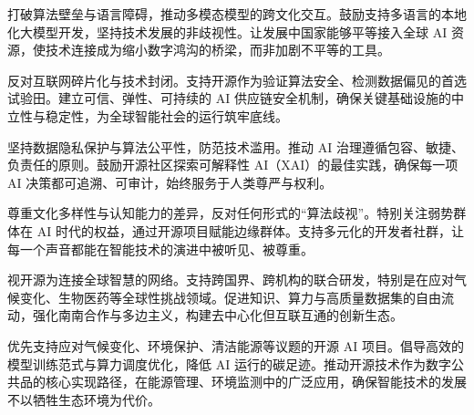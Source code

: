 打破算法壁垒与语言障碍，推动多模态模型的跨文化交互。鼓励支持多语言的本地化大模型开发，坚持技术发展的非歧视性。让发展中国家能够平等接入全球 AI 资源，使技术连接成为缩小数字鸿沟的桥梁，而非加剧不平等的工具。

反对互联网碎片化与技术封闭。支持开源作为验证算法安全、检测数据偏见的首选试验田。建立可信、弹性、可持续的 AI 供应链安全机制，确保关键基础设施的中立性与稳定性，为全球智能社会的运行筑牢底线。

坚持数据隐私保护与算法公平性，防范技术滥用。推动 AI 治理遵循包容、敏捷、负责任的原则。鼓励开源社区探索可解释性 AI（XAI）的最佳实践，确保每一项 AI 决策都可追溯、可审计，始终服务于人类尊严与权利。

尊重文化多样性与认知能力的差异，反对任何形式的“算法歧视”。特别关注弱势群体在 AI 时代的权益，通过开源项目赋能边缘群体。支持多元化的开发者社群，让每一个声音都能在智能技术的演进中被听见、被尊重。

视开源为连接全球智慧的网络。支持跨国界、跨机构的联合研发，特别是在应对气候变化、生物医药等全球性挑战领域。促进知识、算力与高质量数据集的自由流动，强化南南合作与多边主义，构建去中心化但互联互通的创新生态。

优先支持应对气候变化、环境保护、清洁能源等议题的开源 AI 项目。倡导高效的模型训练范式与算力调度优化，降低 AI 运行的碳足迹。推动开源技术作为数字公共品的核心实现路径，在能源管理、环境监测中的广泛应用，确保智能技术的发展不以牺牲生态环境为代价。
